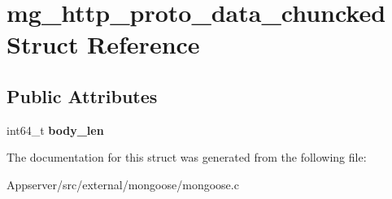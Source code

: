 \hypertarget{structmg__http__proto__data__chuncked}{}\section{mg\+\_\+http\+\_\+proto\+\_\+data\+\_\+chuncked Struct Reference}
\label{structmg__http__proto__data__chuncked}
\subsection*{Public Attributes}
\begin{DoxyCompactItemize}
\item 
int64\+\_\+t {\bfseries body\+\_\+len}\hypertarget{structmg__http__proto__data__chuncked_aeee1125c8814977f3cd571d8db611053}{}\label{structmg__http__proto__data__chuncked_aeee1125c8814977f3cd571d8db611053}

\end{DoxyCompactItemize}


The documentation for this struct was generated from the following file\+:\begin{DoxyCompactItemize}
\item 
Appserver/src/external/mongoose/mongoose.\+c\end{DoxyCompactItemize}
